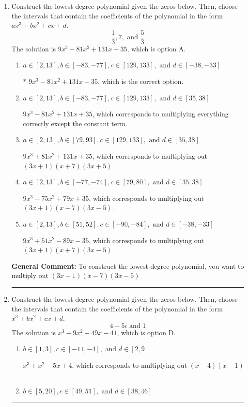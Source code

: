 \documentclass{extbook}[14pt]
\newcommand{\litem}[1]{\item #1

\rule{\textwidth}{0.4pt}}
\begin{document}
\begin{enumerate}\litem{
Construct the lowest-degree polynomial given the zeros below. Then, choose the intervals that contain the coefficients of the polynomial in the form $ax^3+bx^2+cx+d$.
\[ \frac{1}{3}, 7, \text{ and } \frac{5}{3} \]The solution is \( 9x^{3} -81 x^{2} +131 x -35 \), which is option A.\begin{enumerate}[label=\Alph*.]
\item \( a \in [2, 13], b \in [-83, -77], c \in [129, 133], \text{ and } d \in [-38, -33] \)

* $9x^{3} -81 x^{2} +131 x -35$, which is the correct option.
\item \( a \in [2, 13], b \in [-83, -77], c \in [129, 133], \text{ and } d \in [35, 38] \)

$9x^{3} -81 x^{2} +131 x + 35$, which corresponds to multiplying everything correctly except the constant term.
\item \( a \in [2, 13], b \in [79, 93], c \in [129, 133], \text{ and } d \in [35, 38] \)

$9x^{3} +81 x^{2} +131 x + 35$, which corresponds to multiplying out $(3x + 1)(x + 7)(3x + 5)$.
\item \( a \in [2, 13], b \in [-77, -74], c \in [79, 80], \text{ and } d \in [35, 38] \)

$9x^{3} -75 x^{2} +79 x + 35$, which corresponds to multiplying out $(3x + 1)(x -7)(3x -5)$.
\item \( a \in [2, 13], b \in [51, 52], c \in [-90, -84], \text{ and } d \in [-38, -33] \)

$9x^{3} +51 x^{2} -89 x -35$, which corresponds to multiplying out $(3x + 1)(x + 7)(3x -5)$.
\end{enumerate}

\textbf{General Comment:} To construct the lowest-degree polynomial, you want to multiply out $(3x -1)(x -7)(3x -5)$
}
\litem{
Construct the lowest-degree polynomial given the zeros below. Then, choose the intervals that contain the coefficients of the polynomial in the form $x^3+bx^2+cx+d$.
\[ 4 - 5 i \text{ and } 1 \]The solution is \( x^{3} -9 x^{2} +49 x -41 \), which is option D.\begin{enumerate}[label=\Alph*.]
\item \( b \in [1, 3], c \in [-11, -4], \text{ and } d \in [2, 9] \)

$x^{3} + x^{2} -5 x + 4$, which corresponds to multiplying out $(x -4)(x -1)$.
\item \( b \in [5, 20], c \in [49, 51], \text{ and } d \in [38, 46] \)


\end{enumerate}}
\end{enumerate}
\end{document}
